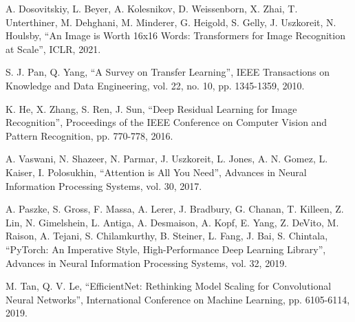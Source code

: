 \documentclass[conference, a4paper]{IEEEtran}
\begin{document}
	\begin{thebibliography}{1}
		A. Dosovitskiy, L. Beyer, A. Kolesnikov, D. Weissenborn, X. Zhai, T. Unterthiner, M. Dehghani, M. Minderer, G. Heigold, S. Gelly, J. Uszkoreit, N. Houlsby, ``An Image is Worth 16x16 Words: Transformers for Image Recognition at Scale'', ICLR, 2021.
		
		S. J. Pan, Q. Yang, ``A Survey on Transfer Learning'', IEEE Transactions on Knowledge and Data Engineering, vol. 22, no. 10, pp. 1345-1359, 2010.
		
		K. He, X. Zhang, S. Ren, J. Sun, ``Deep Residual Learning for Image Recognition'', Proceedings of the IEEE Conference on Computer Vision and Pattern Recognition, pp. 770-778, 2016.
		
		A. Vaswani, N. Shazeer, N. Parmar, J. Uszkoreit, L. Jones, A. N. Gomez, L. Kaiser, I. Polosukhin, ``Attention is All You Need'', Advances in Neural Information Processing Systems, vol. 30, 2017.
		
		A. Paszke, S. Gross, F. Massa, A. Lerer, J. Bradbury, G. Chanan, T. Killeen, Z. Lin, N. Gimelshein, L. Antiga, A. Desmaison, A. Kopf, E. Yang, Z. DeVito, M. Raison, A. Tejani, S. Chilamkurthy, B. Steiner, L. Fang, J. Bai, S. Chintala, ``PyTorch: An Imperative Style, High-Performance Deep Learning Library'', Advances in Neural Information Processing Systems, vol. 32, 2019.
		
		M. Tan, Q. V. Le, ``EfficientNet: Rethinking Model Scaling for Convolutional Neural Networks'', International Conference on Machine Learning, pp. 6105-6114, 2019.
	\end{thebibliography}
\end{document}
